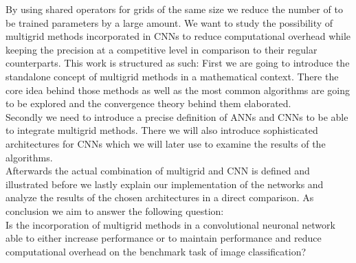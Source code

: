 \documentclass[a4paper,12pt,titlepage,enabledeprecatedfontcommands]{scrreprt}
\begin{document}
By using shared operators for grids of the same size we reduce the number of to be trained parameters by a large amount. We want to study the possibility of multigrid methods incorporated in CNNs to reduce computational overhead while keeping the precision at a competitive level in comparison to their regular counterparts.
This work is structured as such: First we are going to introduce the standalone concept of multigrid methods in a mathematical context. There the core idea behind those methods as well as the most common algorithms are going to be explored and the convergence theory behind them elaborated. \\
Secondly we need to introduce a precise definition of ANNs and CNNs to be able to integrate multigrid methods. There we will also introduce sophisticated architectures for CNNs which we will later use to examine the results of the algorithms. \\
Afterwards the actual combination of multigrid and CNN is defined and illustrated before we lastly explain our implementation of the networks and analyze the results of the chosen architectures in a direct comparison. As conclusion we aim to answer the following question:\\
Is the incorporation of multigrid methods in a convolutional neuronal network able to either increase performance or to maintain performance and reduce computational overhead on the benchmark task of image classification?
\end{document}
